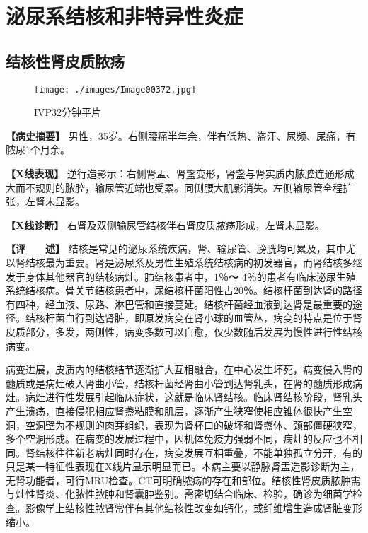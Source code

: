 \section{泌尿系结核和非特异性炎症}

\subsection{结核性肾皮质脓疡}

\begin{figure}[!htbp]
    \centering
    \texttt{[image: ./images/Image00372.jpg]}
    \captionsetup{justification=centering}
    \caption{IVP32分钟平片}
    \label{fig6-4-1}
\end{figure}

\textbf{【病史摘要】}
男性，35岁。右侧腰痛半年余，伴有低热、盗汗、尿频、尿痛，有脓尿1个月余。

\textbf{【X线表现】}
逆行造影示：右侧肾盂、肾盏变形，肾盏与肾实质内脓腔连通形成大而不规则的脓腔，输尿管近端也受累。同侧腰大肌影消失。左侧输尿管全程扩张，左肾未显影。

\textbf{【X线诊断】}
右肾及双侧输尿管结核伴右肾皮质脓疡形成，左肾未显影。

\textbf{【评　　述】}
结核是常见的泌尿系统疾病，肾、输尿管、膀胱均可累及，其中尤以肾结核最为重要。肾是泌尿系及男性生殖系统结核病的初发器官，而肾结核多继发于身体其他器官的结核病灶。肺结核患者中，1％\textbf{～}
4％的患者有临床泌尿生殖系统结核病。骨关节结核患者中，尿结核杆菌阳性占20％。结核杆菌到达肾的路径有四种，经血液、尿路、淋巴管和直接蔓延。结核杆菌经血液到达肾是最重要的途径。结核杆菌血行到达肾脏，即原发病变在肾小球的血管丛，病变的特点是位于肾皮质部分，多发，两侧性，病变多数可以自愈，仅少数随后发展为慢性进行性结核病变。

病变进展，皮质内的结核结节逐渐扩大互相融合，在中心发生坏死，病变侵入肾的髓质或是病灶破入肾曲小管，结核杆菌经肾曲小管到达肾乳头，在肾的髓质形成病灶。病灶进行性发展引起临床症状，这就是临床肾结核。临床肾结核阶段，肾乳头产生溃疡，直接侵犯相应肾盏粘膜和肌层，逐渐产生狭窄使相应锥体很快产生空洞，空洞壁为不规则的肉芽组织，表现为肾杯口的破坏和肾盏体、颈部僵硬狭窄，多个空洞形成。在病变的发展过程中，因机体免疫力强弱不同，病灶的反应也不相同。肾结核往往新老病灶同时存在，病变发展互相重叠，不能单独孤立分开，有的只是某一特征性表现在X线片显示明显而已。本病主要以静脉肾盂造影诊断为主，无肾功能者，可行MRU检查。CT可明确脓疡的存在和部位。结核性肾皮质脓肿需与灶性肾炎、化脓性脓肿和肾囊肿鉴别。需密切结合临床、检验，确诊为细菌学检查。影像学上结核性脓肾常伴有其他结核性改变如钙化，或纤维增生造成肾脏变形缩小。

